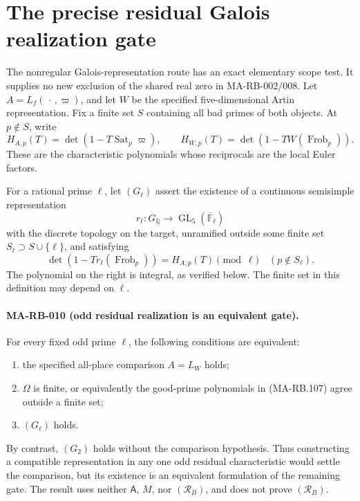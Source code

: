 \section{The precise residual Galois realization gate}
\label{sec:s5-residual-realization}

The nonregular Galois-representation route has an exact elementary
scope test.  It supplies no new exclusion of the shared real zero
in MA-RB-002/008.
Let \(A=L_f(\,\cdot\,,\varpi)\), and let \(W\) be the specified
five-dimensional Artin representation.  Fix a finite set
\(S\) containing all bad primes of both objects.  At \(p\notin S\),
write
\[
 H_{A,p}(T)=\det(1-T\operatorname{Sat}_p\varpi),
 \qquad H_{W,p}(T)=\det(1-TW(\operatorname{Frob}_p)).
 \tag{MA-RB.107}
\]
These are the characteristic polynomials whose reciprocals
are the local Euler factors.

For a rational prime \(\ell\), let \((G_\ell)\) assert the
existence of a continuous semisimple representation
\[
 r_\ell:G_{\mathbb Q}\longrightarrow
                \operatorname{GL}_5(\overline{\mathbb F}_\ell)
 \tag{MA-RB.108}
\]
with the discrete topology on the target, unramified outside
some finite set \(S_\ell\supset S\cup\{\ell\}\), and satisfying
\[
 \det(1-Tr_\ell(\operatorname{Frob}_p))
                 =H_{A,p}(T)\pmod\ell
                 \quad(p\notin S_\ell).
 \tag{MA-RB.109}
\]
The polynomial on the right is integral, as verified below.
The finite set in this definition may depend on \(\ell\).

\paragraph{MA-RB-010 (odd residual realization is an equivalent gate).}
For every fixed odd prime \(\ell\), the following conditions
are equivalent:
\begin{enumerate}
\item the specified all-place comparison \(A=L_W\) holds;
\item \(\Omega\) is finite, or equivalently the good-prime
      polynomials in (MA-RB.107) agree outside a finite set;
\item \((G_\ell)\) holds.
\end{enumerate}
By contrast, \((G_2)\) holds without the comparison hypothesis.
Thus constructing a compatible representation in any one odd
residual characteristic would settle the comparison, but its
existence is an equivalent formulation of the remaining gate.
The result uses neither \(\mathsf A\), \(M\), nor
\((\mathcal R_B)\), and does not prove \((\mathcal R_B)\).

